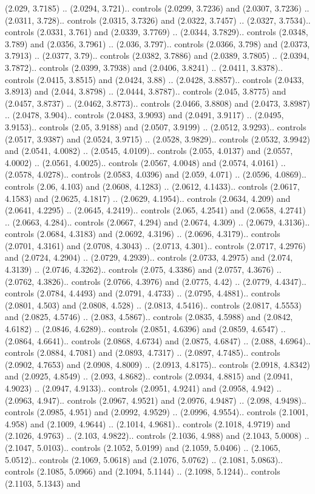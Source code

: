 (2.029, 3.7185) .. (2.0294, 3.721).. controls (2.0299, 3.7236) and (2.0307, 3.7236) .. (2.0311, 3.728).. controls (2.0315, 3.7326) and (2.0322, 3.7457) .. (2.0327, 3.7534).. controls (2.0331, 3.761) and (2.0339, 3.7769) .. (2.0344, 3.7829).. controls (2.0348, 3.789) and (2.0356, 3.7961) .. (2.036, 3.797).. controls (2.0366, 3.798) and (2.0373, 3.7913) .. (2.0377, 3.79).. controls (2.0382, 3.7886) and (2.0389, 3.7805) .. (2.0394, 3.7872).. controls (2.0399, 3.7938) and (2.0406, 3.8241) .. (2.0411, 3.8378).. controls (2.0415, 3.8515) and (2.0424, 3.88) .. (2.0428, 3.8857).. controls (2.0433, 3.8913) and (2.044, 3.8798) .. (2.0444, 3.8787).. controls (2.045, 3.8775) and (2.0457, 3.8737) .. (2.0462, 3.8773).. controls (2.0466, 3.8808) and (2.0473, 3.8987) .. (2.0478, 3.904).. controls (2.0483, 3.9093) and (2.0491, 3.9117) .. (2.0495, 3.9153).. controls (2.05, 3.9188) and (2.0507, 3.9199) .. (2.0512, 3.9293).. controls (2.0517, 3.9387) and (2.0524, 3.9715) .. (2.0528, 3.9829).. controls (2.0532, 3.9942) and (2.0541, 4.0082) .. (2.0545, 4.0109).. controls (2.055, 4.0137) and (2.0557, 4.0002) .. (2.0561, 4.0025).. controls (2.0567, 4.0048) and (2.0574, 4.0161) .. (2.0578, 4.0278).. controls (2.0583, 4.0396) and (2.059, 4.071) .. (2.0596, 4.0869).. controls (2.06, 4.103) and (2.0608, 4.1283) .. (2.0612, 4.1433).. controls (2.0617, 4.1583) and (2.0625, 4.1817) .. (2.0629, 4.1954).. controls (2.0634, 4.209) and (2.0641, 4.2295) .. (2.0645, 4.2419).. controls (2.065, 4.2541) and (2.0658, 4.2741) .. (2.0663, 4.284).. controls (2.0667, 4.294) and (2.0674, 4.309) .. (2.0679, 4.3136).. controls (2.0684, 4.3183) and (2.0692, 4.3196) .. (2.0696, 4.3179).. controls (2.0701, 4.3161) and (2.0708, 4.3043) .. (2.0713, 4.301).. controls (2.0717, 4.2976) and (2.0724, 4.2904) .. (2.0729, 4.2939).. controls (2.0733, 4.2975) and (2.074, 4.3139) .. (2.0746, 4.3262).. controls (2.075, 4.3386) and (2.0757, 4.3676) .. (2.0762, 4.3826).. controls (2.0766, 4.3976) and (2.0775, 4.42) .. (2.0779, 4.4347).. controls (2.0784, 4.4493) and (2.0791, 4.4733) .. (2.0795, 4.4881).. controls (2.0801, 4.503) and (2.0808, 4.528) .. (2.0813, 4.5416).. controls (2.0817, 4.5553) and (2.0825, 4.5746) .. (2.083, 4.5867).. controls (2.0835, 4.5988) and (2.0842, 4.6182) .. (2.0846, 4.6289).. controls (2.0851, 4.6396) and (2.0859, 4.6547) .. (2.0864, 4.6641).. controls (2.0868, 4.6734) and (2.0875, 4.6847) .. (2.088, 4.6964).. controls (2.0884, 4.7081) and (2.0893, 4.7317) .. (2.0897, 4.7485).. controls (2.0902, 4.7653) and (2.0908, 4.8009) .. (2.0913, 4.8175).. controls (2.0918, 4.8342) and (2.0925, 4.8549) .. (2.093, 4.8682).. controls (2.0934, 4.8815) and (2.0941, 4.9023) .. (2.0947, 4.9133).. controls (2.0951, 4.9241) and (2.0958, 4.942) .. (2.0963, 4.947).. controls (2.0967, 4.9521) and (2.0976, 4.9487) .. (2.098, 4.9498).. controls (2.0985, 4.951) and (2.0992, 4.9529) .. (2.0996, 4.9554).. controls (2.1001, 4.958) and (2.1009, 4.9644) .. (2.1014, 4.9681).. controls (2.1018, 4.9719) and (2.1026, 4.9763) .. (2.103, 4.9822).. controls (2.1036, 4.988) and (2.1043, 5.0008) .. (2.1047, 5.0103).. controls (2.1052, 5.0199) and (2.1059, 5.0406) .. (2.1065, 5.0512).. controls (2.1069, 5.0618) and (2.1076, 5.0762) .. (2.1081, 5.0863).. controls (2.1085, 5.0966) and (2.1094, 5.1144) .. (2.1098, 5.1244).. controls (2.1103, 5.1343) and 